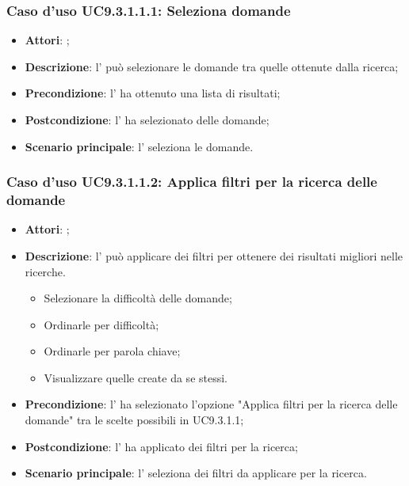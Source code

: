 		 \subsubsection{Caso d'uso UC9.3.1.1.1: Seleziona domande}
		 \label{UC9.3.1.1.1}
		 \begin{itemize}
		 	\item \textbf{Attori}: \uaupro{};
		 	\item \textbf{Descrizione}: l'\uaupro{} può selezionare le domande tra quelle ottenute dalla ricerca;
		 	\item \textbf{Precondizione}: l'\uaupro{} ha ottenuto una lista di risultati;
		 	\item \textbf{Postcondizione}: l'\uaupro{} ha selezionato delle domande; 
		 	\item \textbf{Scenario principale}: l'\uaupro{} seleziona le domande.
		 \end{itemize}
		 
		 \subsubsection{Caso d'uso UC9.3.1.1.2: Applica filtri per la ricerca delle domande}
		 \label{UC9.3.1.1.2}
		 \begin{itemize}
		 	\item \textbf{Attori}: \uaupro{};
		 	\item \textbf{Descrizione}: l'\uaupro{} può applicare dei filtri per ottenere dei risultati migliori nelle ricerche. 
			 	\begin{itemize}
					\item Selezionare la difficoltà delle domande;
					\item Ordinarle per difficoltà;
					\item Ordinarle per parola chiave;
					\item Visualizzare quelle create da se stessi.
			 	\end{itemize}
		 	\item \textbf{Precondizione}: l'\uaupro{} ha selezionato l'opzione "Applica filtri per la ricerca delle domande" tra le scelte possibili in UC9.3.1.1;
		 	\item \textbf{Postcondizione}: l'\uaupro{} ha applicato dei filtri per la ricerca; 
		 	\item \textbf{Scenario principale}: l'\uaupro{} seleziona dei filtri da applicare per la ricerca.
		 \end{itemize}
		 
